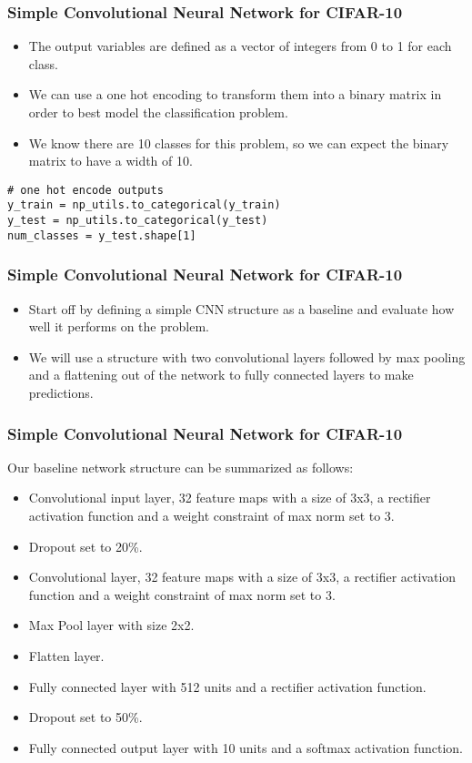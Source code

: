 \begin{frame}[fragile] \frametitle{Simple Convolutional Neural Network for CIFAR-10}
\begin{itemize}
\item The output variables are defined as a vector of integers from 0 to 1 for each class.
\item We can use a one hot encoding to transform them into a binary matrix in order to best model the classification problem. 
\item We know there are 10 classes for this problem, so we can expect the binary matrix to have a width of 10.
\end{itemize}
\begin{lstlisting}
# one hot encode outputs
y_train = np_utils.to_categorical(y_train)
y_test = np_utils.to_categorical(y_test)
num_classes = y_test.shape[1]
\end{lstlisting}
\end{frame}

\begin{frame}[fragile] \frametitle{Simple Convolutional Neural Network for CIFAR-10}
\begin{itemize}
\item Start off by defining a simple CNN structure as a baseline and evaluate how well it performs on the problem.
\item We will use a structure with two convolutional layers followed by max pooling and a flattening out of the network to fully connected layers to make predictions.
\end{itemize}
\end{frame}

\begin{frame}[fragile] \frametitle{Simple Convolutional Neural Network for CIFAR-10}
Our baseline network structure can be summarized as follows:
\begin{itemize}
\item Convolutional input layer, 32 feature maps with a size of 3x3, a rectifier activation function and a weight constraint of max norm set to 3.
\item     Dropout set to 20\%.
\item     Convolutional layer, 32 feature maps with a size of 3x3, a rectifier activation function and a weight constraint of max norm set to 3.
\item     Max Pool layer with size 2x2.
\item     Flatten layer.
\item     Fully connected layer with 512 units and a rectifier activation function.
\item     Dropout set to 50\%.
\item     Fully connected output layer with 10 units and a softmax activation function.

\end{itemize}
\end{frame}

